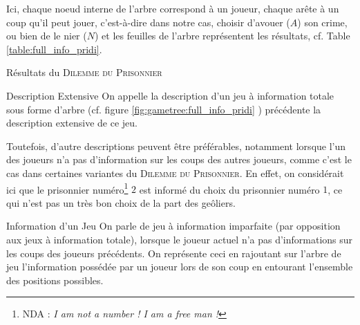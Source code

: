 \documentclass{cours}
\begin{document}
Ici, chaque noeud interne de l'arbre correspond à un joueur, chaque arête à un coup qu'il peut jouer, c'est-à-dire dans notre cas, choisir d'avouer ($A$) son crime, ou bien de le nier ($N$) et les feuilles de l'arbre représentent les résultats, cf. Table \ref{table:full_info_pridi}.\\
\begin{table}[ht]
    \centering
    \caption{Résultats du \textsc{Dilemme du Prisonnier}}
    \label{table:full_info_pridi}
\end{table}
\begin{définition}{Description Extensive}{}
    On appelle la description d'un jeu à information totale sous forme d'arbre (cf. figure \ref{fig:gametree:full_info_pridi} ) précédente la description extensive de ce jeu.
\end{définition}

Toutefois, d'autre descriptions peuvent être préférables, notamment lorsque l'un des joueurs n'a pas d'information sur les coups des autres joueurs, comme c'est le cas dans certaines variantes du \textsc{Dilemme du Prisonnier}. En effet, on considérait ici que le prisonnier numéro\footnote{NDA : \textit{I am not a number ! I am a free man !}} $2$ est informé du choix du prisonnier numéro $1$, ce qui n'est pas un très bon choix de la part des geôliers.
\begin{définition}{Information d'un Jeu}{}
    On parle de jeu à information imparfaite (par opposition aux jeux à information totale), lorsque le joueur actuel n'a pas d'informations sur les coups des joueurs précédents. On représente ceci en rajoutant sur l'arbre de jeu l'information possédée par un joueur lors de son coup en entourant l'ensemble des positions possibles.
\end{définition}
\end{document}
